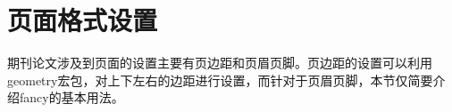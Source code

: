 \section{页面格式设置}%
	期刊论文涉及到页面的设置主要有页边距和页眉页脚。页边距的设置可以利用geometry宏包，对上下左右的边距进行设置，而针对于页眉页脚，本节仅简要介绍fancy的基本用法。